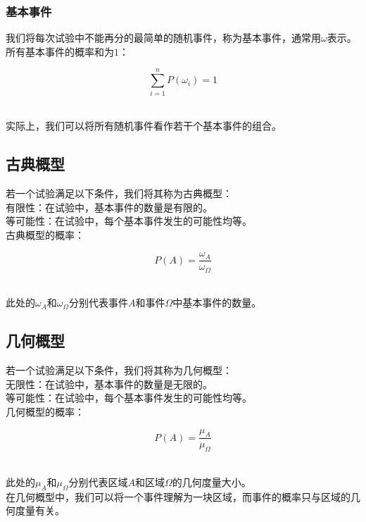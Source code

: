 \documentclass[UTF8]{ctexart}
\begin{document}
\subsubsection{基本事件}
    我们将每次试验中不能再分的最简单的随机事件，称为基本事件，通常用$\omega$表示。\\[3mm]
    所有基本事件的概率和为$1$：
    \begin{large}
        \begin{equation*}
            \sum_{i=1}^{n}P(\omega_i)=1
        \end{equation*}
    \end{large}\\
    实际上，我们可以将所有随机事件看作若干个基本事件的组合。

\subsection{古典概型}
    若一个试验满足以下条件，我们将其称为古典概型：\\[3mm]
    有限性：在试验中，基本事件的数量是有限的。\\[2mm]
    等可能性：在试验中，每个基本事件发生的可能性均等。\\[4mm]
    古典概型的概率：
    \begin{large}
        \begin{equation*}
            P(A)=\frac{\omega_{A}}{\omega_{\Omega}}
        \end{equation*}
    \end{large}\\
    此处的$\omega_A$和$\omega_{\Omega}$分别代表事件$A$和事件$\Omega$中基本事件的数量。\vspace{3pt}

\subsection{几何概型}
    若一个试验满足以下条件，我们将其称为几何概型：\\[3mm]
    无限性：在试验中，基本事件的数量是无限的。\\[2mm]
    等可能性：在试验中，每个基本事件发生的可能性均等。\\[4mm]
    几何概型的概率：
    \begin{large}
        \begin{equation*}
            P(A)=\frac{\mu_{A}}{\mu_{\Omega}}
        \end{equation*}
    \end{large}\\
    此处的$\mu_A$和$\mu_{\Omega}$分别代表区域$A$和区域$\Omega$的几何度量大小。\\[3mm]
    在几何概型中，我们可以将一个事件理解为一块区域，而事件的概率只与区域的几何度量有关。\vspace{3pt}
\end{document}
